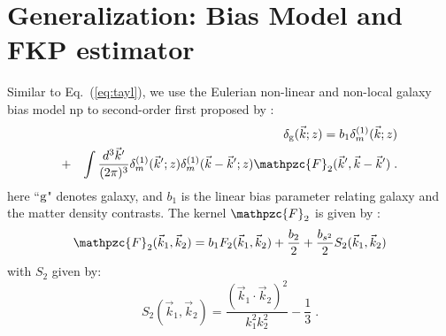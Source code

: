 \documentclass[prd,amsmath,amssymb,floatfix,superscriptaddress,nofootinbib,twocolumn]{revtex4-1}
\def\be{\begin{equation}}
\def\ee{\end{equation}}
\def\bea{\begin{eqnarray}}
\def\eea{\end{eqnarray}}
\newcommand{\vk}{\vec{k}}
\newcommand{\ec}[1]{Eq.~(\ref{eq:#1})}
\newcommand{\eql}[1]{\label{eq:#1}}
\begin{document}
\section{Generalization: Bias Model and FKP estimator} \label{sec3}
Similar to \ec{tayl}, we use the Eulerian non-linear and non-local galaxy bias model np to second-order first proposed by \cite{McDonald:2009dh}:
\bea 
&&\delta_{\rm g}(\vec{k};z) = b_1\delta^{(1)}_m (\vec{k};z)\nonumber \\
&+&\int \frac{d^{3}\vec{k}'}{(2\pi)^3}\delta^{(1)}_{m}(\vec{k}';z)\delta^{(1)}_{m}(\vec{k}-\vec{k}';z)\mathpzc{F}_{2}(\vec{k}',\vec{k}-\vec{k}') \;. \eql{hdc}
\eea 
here ``$\rm g$" denotes galaxy, and $b_{1}$ is the linear bias parameter relating galaxy and the matter density contrasts. The kernel $\mathpzc{F}_2$ is given by \cite{Gil-Marin:2014sta}:
\be 
\mathpzc{F}_2(\vk_1,\vk_2)=b_1F_{2}(\vk_1,\vk_2)+\frac{b_2}{2}+\frac{b_{s^2}}{2}S_{2}(\vk_1,\vk_2)
\ee
with $S_2$ given by:
\be 
S_{2}(\vk_1,\vk_2)=\frac{(\vk_1\cdot \vk_2)^2}{k_1^2k_2^2}-\frac{1}{3}\;.
\ee 
\end{document}
